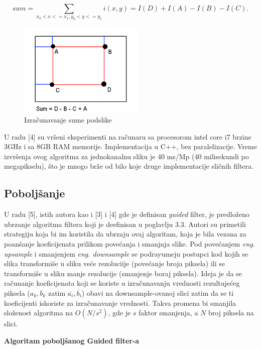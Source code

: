 \documentclass[a4paper,12pt,titlepage]{article}
\begin{document}
\begin{equation}\label{eq:gf19}
sum = \sum_{x_0 < x <= x_1, y_0 < y <= y_1} i(x, y) = I(D) + I(A) - I(B) - I(C).
\end{equation} 

\begin{figure}[ht!]
\centering
\includegraphics[width=60mm]{img/sat.png}
\caption{Izračunavanje sume podslike}
\label{overflow}
\end{figure}

U radu [4] su vršeni eksperimenti na računaru sa procesorom intel core i7 brzine 3GHz i sa 8GB RAM memorije. Implementacija u C++, bez paralelizacije. Vreme izvršenja ovog algoritma za jednokanalnu sliku je 40 ms/Mp (40 milisekundi po megapikselu), što je mnogo brže od bilo koje druge implementacije sličnih filtera.  

\subsection{Poboljšanje}%

U radu [5], istih autora kao i [3] i [4] gde je definisan \emph{guided} filter, je predloženo ubrzanje algoritma filtera koji je deefinisan u poglavlju 3.3. Autori su primetili strategiju koja bi im koristila da ubrzaju ovaj algoritam, koja je bila vezana za poanšanje koeficijenata prilikom povećanja i smanjnja slike. Pod povećanjem \emph{eng. upsample} i smanjenjem \emph{eng. downsample} se podrayumeju postupci kod kojih se slika transformiše u sliku veće rezoluciije (povećanje broja piksela) ili se transformiše u sliku manje rezolucije (smanjenje boraj piksela). Ideja je da se računanje koeficijenata koji se koriste u izračunavanju vrednosti rezultujećeg piksela ($a_k, b_k$ zatim $\overline{a_i}, \overline{b_i}$) obavi na downsample-ovanoj slici zatim da se ti koeficijenti iskoriste za izračunavanje vrednosti. Takva promena bi smanjila složenost algoritma na $O(N / s^2)$, gde je $s$ faktor smanjenja, a $N$ broj piksela na slici. 

\textbf{Algoritam poboljšanog Guided filter-a}
\end{document}
